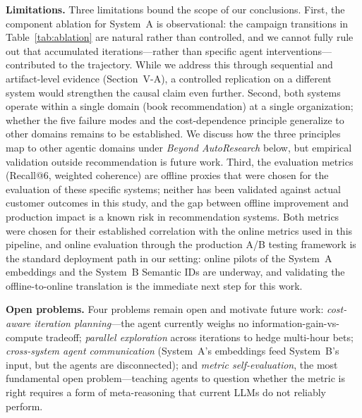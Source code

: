 \documentclass[conference]{IEEEtran}
\begin{document}
\textbf{Limitations.} Three limitations bound the scope of our 
conclusions. First, the component ablation for System~A is 
observational: the campaign transitions in Table~\ref{tab:ablation} 
are natural rather than controlled, and we cannot fully rule out 
that accumulated iterations---rather than specific agent 
interventions---contributed to the trajectory. While we address this through sequential and artifact-level evidence (Section~V-A), a
controlled replication on a different system would strengthen the 
causal claim even further. Second, both systems operate within a single domain (book recommendation) at a single organization; whether the five failure modes and the cost-dependence principle generalize to other domains remains to be established. We discuss how the three principles map to other agentic domains under \textit{Beyond AutoResearch} below, but empirical validation outside recommendation is future work. Third, the evaluation metrics (Recall@6, weighted coherence) are offline proxies that were chosen for the evaluation of these specific systems; neither has been validated against actual customer outcomes in this study, and the gap between offline improvement and production impact is a known risk in recommendation systems. Both metrics were chosen for their established correlation with the online metrics used in this pipeline, and online evaluation through the production A/B testing framework is the standard deployment path in our setting: online pilots of the System~A embeddings and the System~B Semantic IDs are underway, and validating the offline-to-online translation is the immediate next step for this work.


\textbf{Open problems.} Four problems remain open and motivate future work: \textit{cost-aware iteration planning}---the agent currently weighs no information-gain-vs-compute tradeoff; \textit{parallel exploration} across iterations to hedge multi-hour bets; \textit{cross-system agent communication} (System~A's embeddings feed System~B's input, but the agents are disconnected); and \textit{metric self-evaluation}, the most fundamental open problem---teaching agents to question whether the metric is right requires a form of meta-reasoning that current LLMs do not reliably perform.
\end{document}
